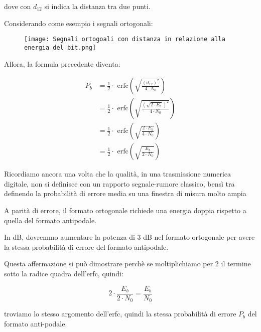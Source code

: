 dove con $d_{12}$ si indica la distanza tra due punti. \newline

Considerando come esempio i segnali ortogonali: 

\begin{figure}[h]
    \centering
    \texttt{[image: Segnali ortogoali con distanza in relazione alla energia del bit.png]}
\end{figure}

Allora, la formula precedente diventa: 

{
    \Large 
    \begin{equation}
        \begin{split}
            P_b 
            &=  
            \frac{1}{2}
        \cdot
        \text{ erfc}
        \left(
            \sqrt{\frac{(d_{12})^{2}}{4 \cdot N_0}}
        \right)
        \\
        &= 
            \frac{1}{2}
        \cdot
        \text{ erfc}
        \left(
            \sqrt{\frac{(\sqrt{2 \cdot E_b})^{2}}{4 \cdot N_0}}
        \right)
        \\
        &= 
            \frac{1}{2}
        \cdot
        \text{ erfc}
        \left(
            \sqrt{\frac{2 \cdot E_b}{4 \cdot N_0}}
        \right)
        \\
        &= 
          \frac{1}{2}
        \cdot
        \text{ erfc}
        \left(
            \sqrt{\frac{E_b}{2 \cdot N_0}}
        \right)
        \end{split}
    \end{equation}
}

\begin{tcolorbox}
    Ricordiamo ancora una volta che la qualità, in una trasmissione numerica digitale, 
    non si definisce con un rapporto segnale-rumore classico, bensì tra definendo la probabilità di errore media su una finestra di misura molto ampia
\end{tcolorbox}

A parità di errore, il formato ortogonale richiede una energia doppia rispetto a quella del formato antipodale. \newline 

In dB, dovremmo aumentare la potenza di 3 dB nel formato ortogonale per avere la stessa probabilità di errore del formato antipodale. \newline 

\begin{tcolorbox}
    Questa affermazione si può dimostrare perchè se moltiplichiamo per 2 il termine sotto la radice quadra dell'erfc, quindi: 

    {
        \Large 
        \begin{equation}
            2 \cdot \frac{E_b}{2 \cdot N_0} = \frac{E_b}{N_0} 
        \end{equation}
    }

    troviamo lo stesso argomento dell'erfc, quindi la stessa probabilità di errore $P_b$ del formato anti-podale.
\end{tcolorbox}

